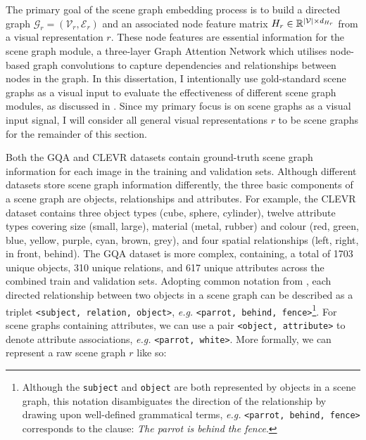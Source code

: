 The primary goal of the scene graph embedding process is to build a directed graph \(\mathcal{G}_r = (\mathcal{V}_r, \mathcal{E}_r)\) and an associated node feature matrix \(H_r \in \mathbb{R}^{|\mathcal{V}| \times d_{H_r}}\) from a visual representation \(r\). These node features are essential information for the scene graph module, a three-layer Graph Attention Network \cite{velivckovic2017graph} which utilises node-based graph convolutions to capture dependencies and relationships between nodes in the graph. In this dissertation, I intentionally use gold-standard scene graphs as a visual input to evaluate the effectiveness of different scene graph modules, as discussed in \sectionautorefname{ \ref{sec:ablation_studies}}. Since my primary focus is on scene graphs as a visual input signal, I will consider all general visual representations \(r\) to be scene graphs for the remainder of this section.

Both the GQA and CLEVR datasets contain ground-truth scene graph information for each image in the training and validation sets. Although different datasets store scene graph information differently, the three basic components of a scene graph are objects, relationships and attributes. For example, the CLEVR dataset contains three object types (cube, sphere, cylinder), twelve attribute types covering size (small, large), material (metal, rubber) and colour (red, green, blue, yellow, purple, cyan, brown, grey), and four spatial relationships (left, right, in front, behind). The GQA dataset is more complex, containing, a total of 1703 unique objects, 310 unique relations, and 617 unique attributes across the combined train and validation sets. Adopting common notation from \cite{hudson2019gqa, li2019relation, yang2018graph}, each directed relationship between two objects in a scene graph can be described as a triplet \texttt{<subject, relation, object>}, \textit{e.g.} \texttt{<parrot, behind, fence>}\footnote{Although the \texttt{subject} and \texttt{object} are both represented by objects in a scene graph, this notation disambiguates the direction of the relationship by drawing upon well-defined grammatical terms, \textit{e.g.} \texttt{<parrot, behind, fence>} corresponds to the clause: \textit{The parrot is behind the fence}.}. For scene graphs containing attributes, we can use a pair \texttt{<object, attribute>} to denote attribute associations, \textit{e.g.} \texttt{<parrot, white>}. More formally, we can represent a raw scene graph 
\(r\) like so:

